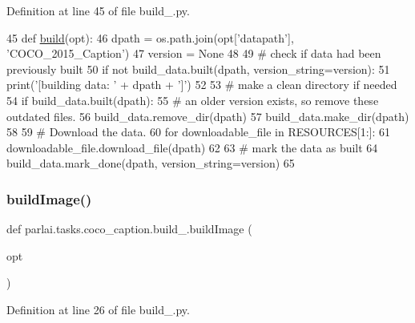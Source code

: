 Definition at line 45 of file build\+\_.\+py.


\begin{DoxyCode}
45 \textcolor{keyword}{def }\hyperlink{namespaceparlai_1_1tasks_1_1coco__caption_1_1build__2015_aa6b66a784b4f4fe03e5cb84f1195dc69}{build}(opt):
46     dpath = os.path.join(opt[\textcolor{stringliteral}{'datapath'}], \textcolor{stringliteral}{'COCO\_2015\_Caption'})
47     version = \textcolor{keywordtype}{None}
48 
49     \textcolor{comment}{# check if data had been previously built}
50     \textcolor{keywordflow}{if} \textcolor{keywordflow}{not} build\_data.built(dpath, version\_string=version):
51         print(\textcolor{stringliteral}{'[building data: '} + dpath + \textcolor{stringliteral}{']'})
52 
53         \textcolor{comment}{# make a clean directory if needed}
54         \textcolor{keywordflow}{if} build\_data.built(dpath):
55             \textcolor{comment}{# an older version exists, so remove these outdated files.}
56             build\_data.remove\_dir(dpath)
57         build\_data.make\_dir(dpath)
58 
59         \textcolor{comment}{# Download the data.}
60         \textcolor{keywordflow}{for} downloadable\_file \textcolor{keywordflow}{in} RESOURCES[1:]:
61             downloadable\_file.download\_file(dpath)
62 
63         \textcolor{comment}{# mark the data as built}
64         build\_data.mark\_done(dpath, version\_string=version)
65 \end{DoxyCode}
\mbox{\label{namespaceparlai_1_1tasks_1_1coco__caption_1_1build__2015_a52edd896124184ec02d76b23368557aa}} 
\subsubsection{\texorpdfstring{build\+Image()}{buildImage()}}
{\footnotesize\ttfamily def parlai.\+tasks.\+coco\+\_\+caption.\+build\+\_.\+build\+Image (\begin{DoxyParamCaption}\item[{}]{opt }\end{DoxyParamCaption})}



Definition at line 26 of file build\+\_.\+py.


